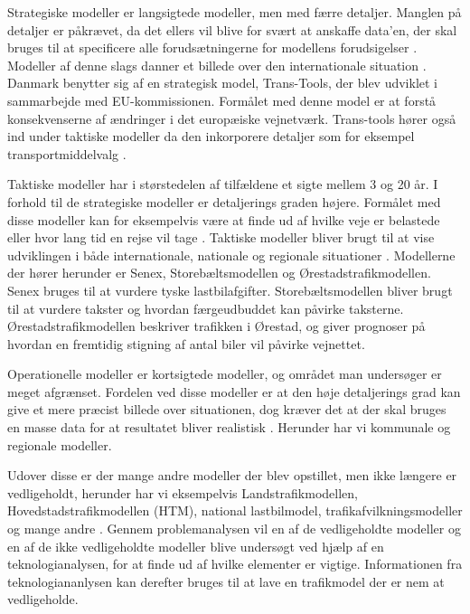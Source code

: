 \vspace{5mm}

Strategiske modeller er langsigtede modeller, men med færre detaljer. Manglen på detaljer er påkrævet, da det ellers vil blive for svært at anskaffe data’en, der skal bruges til at specificere alle forudsætningerne for modellens forudsigelser \cite[s. 1]{dtfnotat}. Modeller af denne slags danner et billede over den internationale situation \cite[s. 9]{dtfnotat}. Danmark benytter sig af en strategisk model, Trans-Tools, der blev udviklet i sammarbejde med EU-kommissionen. Formålet med denne model er at forstå konsekvenserne af ændringer i det europæiske vejnetværk. Trans-tools hører også ind under taktiske modeller da den inkorporere detaljer som for eksempel transportmiddelvalg \cite[s. 10]{dtfnotat}.

\vspace{5mm}

Taktiske modeller har i størstedelen af tilfældene et sigte mellem 3 og 20 år. I forhold til de strategiske modeller er detaljerings graden højere. Formålet med disse modeller kan for eksempelvis være at finde ud af hvilke veje er belastede eller hvor lang tid en rejse vil tage \cite[s1]{dtfnotat}. Taktiske modeller bliver brugt til at vise udviklingen i både internationale, nationale og regionale situationer \cite[s. 9]{dtfnotat}. Modellerne der hører herunder er Senex, Storebæltsmodellen og Ørestadstrafikmodellen. Senex bruges til at vurdere tyske lastbilafgifter. Storebæltsmodellen bliver brugt til at vurdere takster og hvordan færgeudbuddet kan påvirke taksterne. Ørestadstrafikmodellen beskriver trafikken i Ørestad, og giver prognoser på hvordan en fremtidig stigning af antal biler vil påvirke vejnettet.

\vspace{5mm}

Operationelle modeller er kortsigtede modeller, og området man undersøger er meget afgrænset. Fordelen ved disse modeller er at den høje detaljerings grad kan give et mere præcist billede over situationen, dog kræver det at der skal bruges en masse data for at resultatet bliver realistisk \cite[s. 1]{dtfnotat}. Herunder har vi kommunale og regionale modeller.

\vspace{5mm}

Udover disse er der mange andre modeller der blev opstillet, men ikke længere er vedligeholdt, herunder har vi eksempelvis Landstrafikmodellen, Hovedstadstrafikmodellen (HTM), national lastbilmodel, trafikafvilkningsmodeller og mange andre \cite[s. 8]{dtfnotat}. Gennem problemanalysen vil en af de vedligeholdte modeller og en af de ikke vedligeholdte modeller blive undersøgt ved hjælp af en teknologianalysen, for at finde ud af hvilke elementer er vigtige. Informationen fra teknologiananlysen kan derefter bruges til at lave en trafikmodel der er nem at vedligeholde.